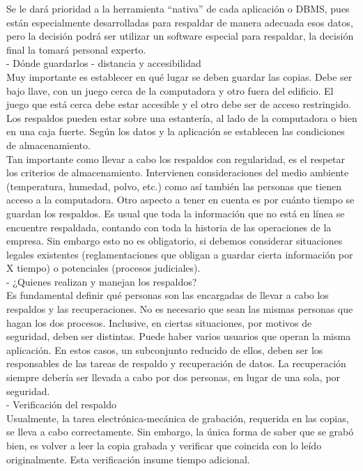 \documentclass[12pt,letterpaper]{article}
\begin{document}
Se le dará prioridad a la herramienta “nativa” de cada aplicación o DBMS, pues están especialmente desarrolladas para respaldar de manera adecuada esos datos, pero la decisión podrá ser utilizar un software especial para respaldar, la decisión final la tomará personal experto. \\

-	Dónde guardarlos - distancia y accesibilidad  \\

Muy importante es establecer en qué lugar se deben guardar las copias. Debe ser bajo llave, con un juego cerca de la computadora y otro fuera del edificio. El juego que está cerca debe estar accesible y el otro debe ser de acceso restringido. Los respaldos pueden estar sobre una estantería, al lado de la computadora o bien en una caja fuerte. Según los datos y la aplicación se establecen las condiciones de almacenamiento. \\

Tan importante como llevar a cabo los respaldos con regularidad, es el respetar los criterios de almacenamiento. Intervienen consideraciones del medio ambiente (temperatura, humedad, polvo, etc.) como así también las personas que tienen acceso a la computadora.  
Otro aspecto a tener en cuenta es por cuánto tiempo se guardan los respaldos. Es usual que toda la información que no está en línea se encuentre respaldada, contando con toda la historia de las operaciones de la empresa. Sin embargo esto no es obligatorio, si debemos considerar situaciones legales existentes (reglamentaciones que obligan a guardar cierta información por X tiempo) o potenciales (procesos judiciales). \\

-	¿Quienes realizan y manejan los respaldos?\\
 
Es fundamental definir qué personas son las encargadas de llevar a cabo los respaldos y las recuperaciones. No es necesario que sean las mismas personas que hagan los dos procesos. Inclusive, en ciertas situaciones, por motivos de seguridad, deben ser distintas. Puede haber varios usuarios que operan la misma aplicación. En estos casos, un subconjunto reducido de ellos, deben ser los responsables de las tareas de respaldo y recuperación de datos. La recuperación siempre debería ser llevada a cabo por dos personas, en lugar de una sola, por seguridad.\\

-	Verificación del respaldo \\
Usualmente, la tarea electrónica-mecánica de grabación, requerida en las copias, se lleva a cabo correctamente. Sin embargo, la única forma de saber que se grabó bien, es volver a leer la copia grabada y verificar que coincida con lo leído originalmente. Esta verificación insume tiempo adicional. \\
 
\end{document}
